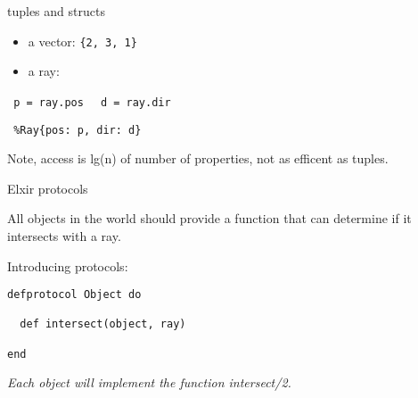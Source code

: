 \begin{frame}[fragile]{tuples and structs}

 \begin{itemize}
  \item a vector: {\tt \{2, 3, 1\}}
  \item a ray:  %
 \end{itemize}

 \pause\vspace{20pt}

\verb+ p = ray.pos +
\verb+ d = ray.dir +

 \pause\vspace{10pt}

\verb+ %Ray{pos: p, dir: d} + 

\pause \vspace{10pt}
Note, access is lg(n) of number of properties, not as efficent as tuples.
\end{frame}


\begin{frame}[fragile]{Elxir protocols}

  All objects in the world should provide a function that can
  determine if it intersects with a ray.

  \pause

  Introducing protocols:
  
\begin{verbatim}
defprotocol Object do

  def intersect(object, ray)

end
\end{verbatim}

\pause\vspace{20pt}

{\em  Each object will implement the function intersect/2.}
  
\end{frame}



